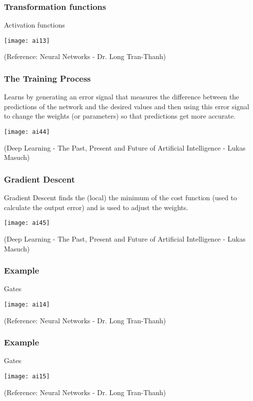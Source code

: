 \begin{frame}[fragile] \frametitle{Transformation functions}
Activation functions
\begin{center}
\texttt{[image: ai13]}
\end{center}
\tiny{(Reference: Neural Networks - Dr. Long Tran-Thanh)}
\end{frame}

\begin{frame}[fragile] \frametitle{The Training Process}
Learns by generating an error signal that measures the difference between the
predictions of the network and the desired values and then using this error signal
to change the weights (or parameters) so that predictions get more accurate.
\begin{center}
\texttt{[image: ai44]}
\end{center}
{\tiny (Deep Learning - The Past, Present and Future of Artificial Intelligence - Lukas Masuch)}
\end{frame}

\begin{frame}[fragile] \frametitle{Gradient Descent}
Gradient Descent finds the (local) the minimum of the cost function (used to
calculate the output error) and is used to adjust the weights.
\begin{center}
\texttt{[image: ai45]}
\end{center}
{\tiny (Deep Learning - The Past, Present and Future of Artificial Intelligence - Lukas Masuch)}
\end{frame}


\begin{frame}[fragile] \frametitle{Example}
Gates
\begin{center}
\texttt{[image: ai14]}
\end{center}
\tiny{(Reference: Neural Networks - Dr. Long Tran-Thanh)}

\end{frame}

\begin{frame}[fragile] \frametitle{Example}
Gates
\begin{center}
\texttt{[image: ai15]}
\end{center}
\tiny{(Reference: Neural Networks - Dr. Long Tran-Thanh)}

\end{frame}

